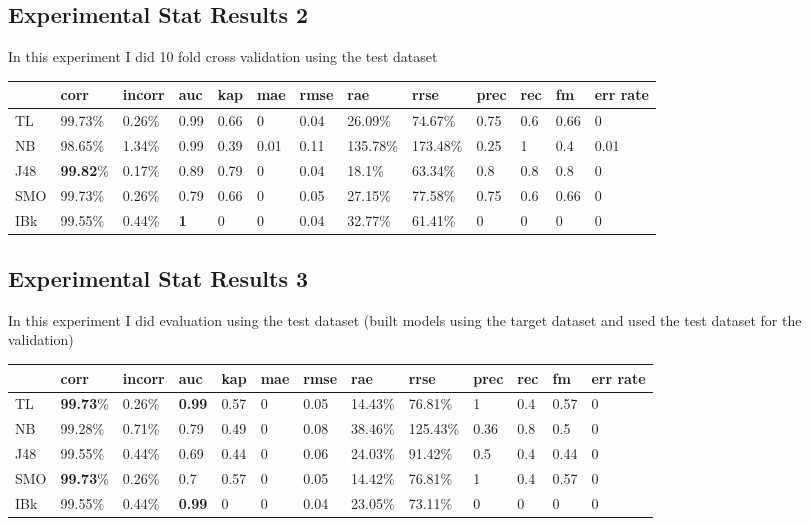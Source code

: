 \documentclass[a4paper,12pt, english]{article}
\begin{document}
\subsection{Experimental Stat Results 2}
In this experiment I did 10 fold cross validation using the test dataset
\begin{small}
\begin{center}
    \begin{tabular}{ | l | l | l | l | l | l | l | l | l | l | l | l | l |}
    \hline
& corr & incorr  & auc & kap & mae & rmse & rae & rrse & prec & rec & fm & err rate\\ \hline    
TL & 99.73\% & 0.26\% & 0.99 & 0.66 & 0 & 0.04 & 26.09\% & 74.67\% & 0.75 & 0.6 & 0.66 & 0\\ \hline
NB & 98.65\% & 1.34\% & 0.99 & 0.39 & 0.01 & 0.11 & 135.78\% & 173.48\% & 0.25 & 1 & 0.4 & 0.01\\ \hline
J48 & \textbf{99.82}\% & 0.17\% & 0.89 & 0.79 & 0 & 0.04 & 18.1\% & 63.34\% & 0.8 & 0.8 & 0.8 & 0\\ \hline
SMO & 99.73\% & 0.26\% & 0.79 & 0.66 & 0 & 0.05 & 27.15\% & 77.58\% & 0.75 & 0.6 & 0.66 & 0\\ \hline
IBk & 99.55\% & 0.44\% & \textbf{1} & 0 & 0 & 0.04 & 32.77\% & 61.41\% & 0 & 0 & 0 & 0\\ \hline
    
    \end{tabular}       
\end{center}
\end{small}

\subsection{Experimental Stat Results 3}
In this experiment I did evaluation using the test dataset (built models using the target dataset and used the test dataset for the validation)
\begin{small}
\begin{center}
    \begin{tabular}{ | l | l | l | l | l | l | l | l | l | l | l | l | l |}
    \hline
& corr & incorr  & auc & kap & mae & rmse & rae & rrse & prec & rec & fm & err rate\\ \hline    
TL & \textbf{99.73}\% & 0.26\% & \textbf{0.99} & 0.57 & 0 & 0.05 & 14.43\% & 76.81\% & 1 & 0.4 & 0.57 & 0\\ \hline  
NB & 99.28\% & 0.71\% & 0.79 & 0.49 & 0 & 0.08 & 38.46\% & 125.43\% & 0.36 & 0.8 & 0.5 & 0\\ \hline
J48 & 99.55\% & 0.44\% & 0.69 & 0.44 & 0 & 0.06 & 24.03\% & 91.42\% & 0.5 & 0.4 & 0.44 & 0\\ \hline
SMO & \textbf{99.73}\% & 0.26\% & 0.7 & 0.57 & 0 & 0.05 & 14.42\% & 76.81\% & 1 & 0.4 & 0.57 & 0\\ \hline
IBk & 99.55\% & 0.44\% & \textbf{0.99} & 0 & 0 & 0.04 & 23.05\% & 73.11\% & 0 & 0 & 0 & 0  \\ \hline
    
    \end{tabular}       
\end{center}
\end{small}
\end{document}
